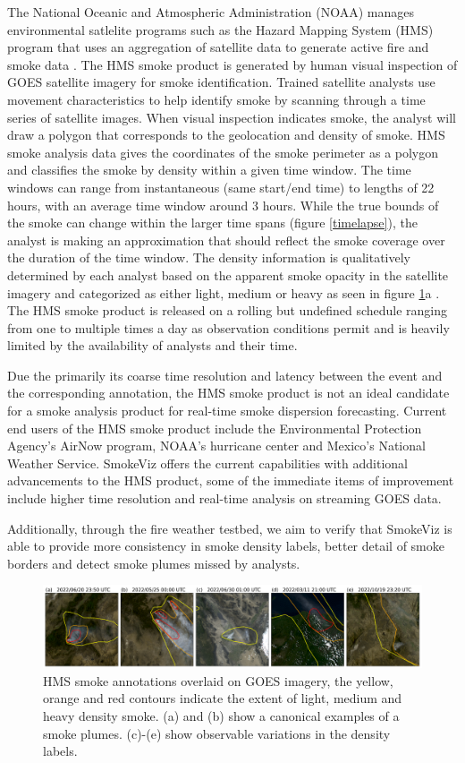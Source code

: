 The National Oceanic and Atmospheric Administration (NOAA) manages environmental satlelite programs such as the Hazard Mapping System (HMS) program that uses an aggregation of satellite data to generate active fire and smoke data \cite{hms, hms_val}. The HMS smoke product \cite{hms, hms_val} is generated by human visual inspection of GOES satellite imagery for smoke identification. Trained satellite analysts use movement characteristics to help identify smoke by scanning through a time series of satellite images. When visual inspection indicates smoke, the analyst will draw a polygon that corresponds to the geolocation and density of smoke. HMS smoke analysis data gives the coordinates of the smoke perimeter as a polygon and classifies the smoke by density within a given time window. The time windows can range from instantaneous (same start/end time) to lengths of 22 hours, with an average time window around 3 hours. While the true bounds of the smoke can change within the larger time spans (figure \ref{timelapse}), the analyst is making an approximation that should reflect the smoke coverage over the duration of the time window. The density information is qualitatively determined by each analyst based on the apparent smoke opacity in the satellite imagery and categorized as either light, medium or heavy as seen in figure \ref{densities}a \cite{hms_web}. The HMS smoke product is released on a rolling but undefined schedule ranging from one to multiple times a day as observation conditions permit and is heavily limited by the availability of analysts and their time. 

Due the primarily its coarse time resolution and latency between the event and the corresponding annotation, the HMS smoke product is not an ideal candidate for a smoke analysis product for real-time smoke dispersion forecasting. Current end users of the HMS smoke product include the Environmental Protection Agency's AirNow program, NOAA's hurricane center and Mexico's National Weather Service. SmokeViz offers the current capabilities with additional advancements to the HMS product, some of the immediate items of improvement include higher time resolution and real-time analysis on streaming GOES data. 

Additionally, through the fire weather testbed, we aim to verify that SmokeViz is able to provide more consistency in smoke density labels, better detail of smoke borders and detect smoke plumes missed by analysts. 

\begin{figure}
    \centering
    \includegraphics[width=\linewidth]{figures/variations2.png}
    \caption{HMS smoke annotations overlaid on GOES imagery, the yellow, orange and red contours indicate the extent of light, medium and heavy density smoke. (a) and (b) show a canonical examples of a smoke plumes. (c)-(e) show observable variations in the density labels.}\label{densities}
\end{figure}


